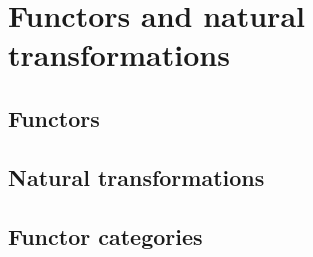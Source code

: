 \chapter{Functors and natural transformations}

\section{Functors}

\section{Natural transformations}

\section{Functor categories}






